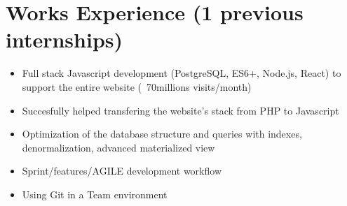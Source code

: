 
\section{Works Experience (1 previous internships)}
\begin{minipage}{.15\textwidth}
    \centerline{}
\end{minipage}%
\hspace{5mm}
\begin{minipage}{.9\textwidth}
    \raggedright
    \begin{minipage}[t]{.8\textwidth}
        \begin{itemize}
            \item Full stack Javascript development (PostgreSQL, ES6+, Node.js, React) to support the entire website (~70millions visits/month)
            \item Succesfully helped transfering the website's stack from PHP to Javascript
            \item Optimization of the database structure and queries with indexes, denormalization, advanced materialized view
            \item Sprint/features/AGILE development workflow
            \item Using Git in a Team environment
        \end{itemize}
    \end{minipage}
\end{minipage}
